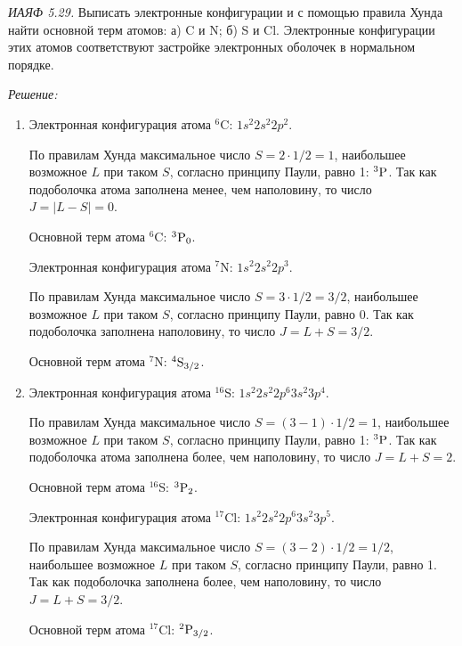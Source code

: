 \emph{ИАЯФ 5.29.}
Выписать электронные конфигурации и с помощью правила Хунда найти основной
терм атомов: а) C и N; б) S и Cl. Электронные конфигурации этих атомов
соответствуют застройке электронных оболочек в нормальном порядке.

\vspace*{2em}
\emph{Решение:}
\begin{enumerate}
\item Электронная конфигурация атома \( ^6\)C: \( 1s^2 2s^2 2p^2 \).
    
    По правилам Хунда максимальное число \( S = 2 \cdot 1/2 = 1 \), наибольшее
    возможное \( L \) при таком \( S \), согласно принципу Паули, равно 1:
    \( ^3\mathrm{P} \).
    Так как подоболочка атома заполнена менее, чем наполовину, то число
    \( J = |L - S| = 0 \).
    
    Основной терм атома \( ^6 \)C: \( ^3\mathrm{P}_0 \).
    
    Электронная конфигурация атома \( ^7\)N: \( 1s^2 2s^2 2p^3 \).

    По правилам Хунда максимальное число \( S = 3 \cdot 1/2 = 3/2 \), наибольшее
    возможное \( L \) при таком \( S \), согласно принципу Паули, равно 0. Так
    как подоболочка заполнена наполовину, то число \( J = L + S = 3/2 \).
    
    Основной терм атома \( ^7 \)N: \( ^4\mathrm{S}_{3/2} \).
    
    \item Электронная конфигурация атома \( ^{16}\)S: \( 1s^2 2s^2 2p^6 3s^2
    3p^4 \).
    
    По правилам Хунда максимальное число \( S = (3 - 1) \cdot 1/2 = 1 \), наибольшее
    возможное \( L \) при таком \( S \), согласно принципу Паули, равно 1:
    \( ^3\mathrm{P} \).
    Так как подоболочка атома заполнена более, чем наполовину, то число
    \( J = L + S = 2 \).
    
    Основной терм атома \( ^{16} \)S: \( ^3\mathrm{P}_2 \).
    
    Электронная конфигурация атома \( ^{17}\)Cl: \( 1s^2 2s^2 2p^6 3s^2
    3p^5 \).

    По правилам Хунда максимальное число \( S = (3 - 2) \cdot 1/2 = 1/2 \),
    наибольшее возможное \( L \) при таком \( S \), согласно принципу Паули,
    равно 1. Так как подоболочка заполнена более, чем наполовину, то число
    \( J = L + S = 3/2 \).
    
    Основной терм атома \( ^{17} \)Cl: \( ^2\mathrm{P}_{3/2} \).
\end{enumerate}

